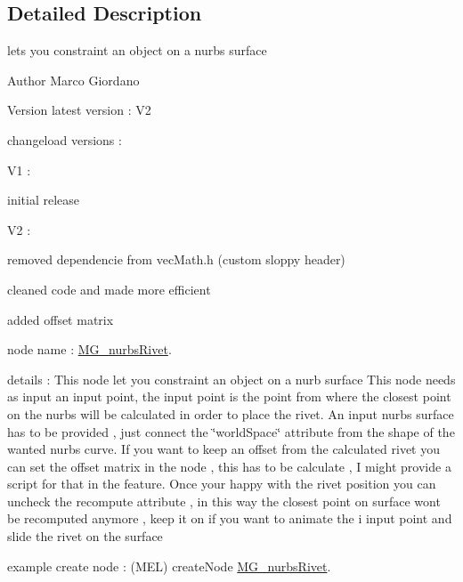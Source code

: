\subsection{Detailed Description}
lets you constraint an object on a nurbs surface 

\begin{DoxyAuthor}{Author}
Marco Giordano 
\end{DoxyAuthor}
\begin{DoxyVersion}{Version}
latest version \-: V2 

changeload versions \-: \par
 V1 \-: \par

\begin{DoxyItemize}
\item initial release \par
 
\end{DoxyItemize}

V2 \-:
\begin{DoxyItemize}
\item removed dependencie from vec\-Math.\-h (custom sloppy header)
\item cleaned code and made more efficient
\item added offset matrix
\end{DoxyItemize}
\end{DoxyVersion}
node name \-: \hyperlink{class_m_g__nurbs_rivet}{M\-G\-\_\-nurbs\-Rivet}.

details \-: This node let you constraint an object on a nurb surface This node needs as input an input point, the input point is the point from where the closest point on the nurbs will be calculated in order to place the rivet. An input nurbs surface has to be provided , just connect the \char`\"{}world\-Space\char`\"{} attribute from the shape of the wanted nurbs curve. If you want to keep an offset from the calculated rivet you can set the offset matrix in the node , this has to be calculate , I might provide a script for that in the feature. Once your happy with the rivet position you can uncheck the recompute attribute , in this way the closest point on surface wont be recomputed anymore , keep it on if you want to animate the i input point and slide the rivet on the surface

example create node \-: (M\-E\-L) create\-Node \hyperlink{class_m_g__nurbs_rivet}{M\-G\-\_\-nurbs\-Rivet}. 

